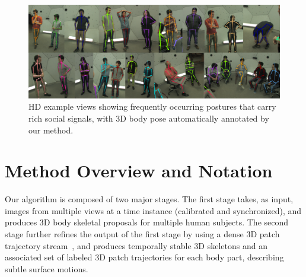 \begin{figure}[t]
	\includegraphics[width=\linewidth]{figures/iconicSocialPose}
	\caption{HD example views showing frequently occurring postures that carry rich social signals, with 3D body pose automatically annotated by our method.} 
	\label{fig:iconicPoses}
\end{figure}

\section{Method Overview and Notation}
Our algorithm is composed of two major stages. The first stage takes, as input, images from multiple views at a time instance (calibrated and synchronized), and produces 3D body skeletal proposals for multiple human subjects. The second stage further refines the output of the first stage by using a dense 3D patch trajectory stream~\cite{Joo2014}, and produces temporally stable 3D skeletons and an associated set of labeled 3D patch trajectories for each body part, describing subtle surface motions.

